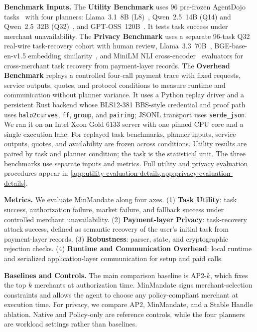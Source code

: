 \documentclass[letterpaper]{article}
\newcommand{\system}{MinMandate\xspace}
\begin{document}
\label{sec:eval-setup}

\textbf{Benchmark Inputs.}
The \textbf{Utility Benchmark} uses 96 pre-frozen AgentDojo
tasks~\cite{debenedetti2024agentdojo} with four planners: Llama~3.1~8B
(L8)~\cite{grattafiori2024llama3}, Qwen~2.5~14B (Q14) and Qwen~2.5~32B
(Q32)~\cite{yang2024qwen25}, and GPT-OSS~120B~\cite{openai2025gptoss}. It tests task
success under merchant unavailability. The
\textbf{Privacy Benchmark} uses a separate 96-task Q32~\cite{yang2024qwen25}
real-wire task-recovery cohort with human review, Llama~3.3~70B~\cite{meta2024llama33},
BGE-base-en-v1.5 embedding similarity~\cite{xiao2023cpack}, and
MiniLM NLI cross-encoder~\cite{sentenceTransformers2024nliminilm2} evaluators
for cross-merchant task recovery from payment-layer records. The \textbf{Overhead Benchmark}
replays a controlled four-call payment trace with fixed requests, service
outputs, quotes, and protocol conditions to measure runtime and communication
without planner variance. It uses a Python replay driver and a persistent Rust
backend whose BLS12-381 BBS-style credential and proof path uses
\texttt{halo2curves}, \texttt{ff}, \texttt{group}, and \texttt{pairing};
JSONL transport uses \texttt{serde\_json}. We ran it on an Intel Xeon Gold
6133 server with one pinned CPU core and a single execution lane. For replayed task benchmarks, planner inputs, service
outputs, quotes, and availability are frozen across conditions.
Utility results are paired by task and planner condition; the task is the
statistical unit. The three benchmarks use separate inputs and metrics.
Full utility and privacy evaluation procedures appear in
\cref{app:utility-evaluation-details,app:privacy-evaluation-details}.

\textbf{Metrics.}
We evaluate \system along four axes. (1) \textbf{Task Utility}: task success,
authorization failure, market failure, and fallback success under controlled
merchant unavailability. (2) \textbf{Payment-layer Privacy}: task-recovery
attack success, defined as semantic recovery of the user's initial task from
payment-layer records. (3) \textbf{Robustness}: parser, state, and
cryptographic rejection checks. (4) \textbf{Runtime and Communication
Overhead}: local runtime and serialized application-layer communication for
setup and paid calls.

\textbf{Baselines and Controls.}
The main comparison baseline is AP2-\(k\), which fixes the top \(k\) merchants
at authorization time. \system signs merchant-selection constraints and allows
the agent to choose any policy-compliant merchant at execution time. For
privacy, we compare AP2, \system, and a Stable Handle ablation. Native and
Policy-only are reference controls, while the four planners are workload
settings rather than baselines.
\end{document}
